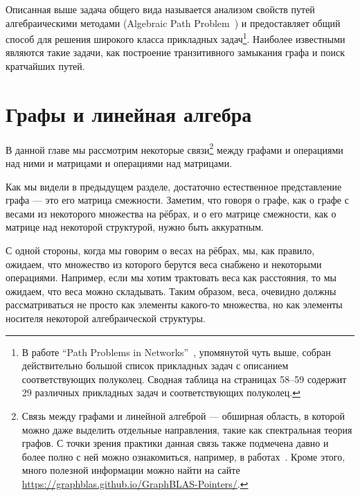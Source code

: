 Описанная выше задача общего вида называется анализом свойств путей алгебраическими методами (Algebraic Path Problem~\cite{Baras2010PathPI}) и предоставляет общий способ для решения широкого класса прикладных задач\footnote{В работе ``Path Problems in Networks''~\cite{Baras2010PathPI}, упомянутой чуть выше, собран действительно большой список прикладных задач с описанием соответствующих полуколец. Сводная таблица на страницах 58--59 содержит 29 различных прикладных задач и соответствующих полуколец.}. Наиболее известными являются такие задачи, как построение транзитивного замыкания графа и поиск кратчайших путей.



\section{Графы и линейная алгебра}

В данной главе мы рассмотрим некоторые связи\footnote{Связь между графами и линейной алгеброй --- обширная область, в которой можно даже выделить отдельные направления, такие как спектральная теория графов. С точки зрения практики данная связь также подмечена давно и более полно с ней можно ознакомиться, например, в работах~\cite{doi:10.1137/1.9780898719918, Davis2018Algorithm9S}. Кроме этого, много полезной информации можно найти на сайте \url{https://graphblas.github.io/GraphBLAS-Pointers/}.} между графами и операциями над ними и матрицами и операциями над матрицами. 

Как мы видели в предыдущем разделе, достаточно естественное представление графа --- это его матрица смежности. Заметим, что говоря о графе, как о графе с весами из некоторого множества на рёбрах, и о его матрице смежности, как о матрице над некоторой структурой, нужно быть аккуратным.

С одной стороны, когда мы говорим о весах на рёбрах, мы, как правило, ожидаем, что множество из которого берутся веса снабжено и некоторыми операциями. Например, если мы хотим трактовать веса как расстояния, то мы ожидаем, что веса можно складывать. Таким образом, веса, очевидно должны рассматриваться не просто как элементы какого-то множества, но как элементы носителя некоторой алгебраической структуры. 

